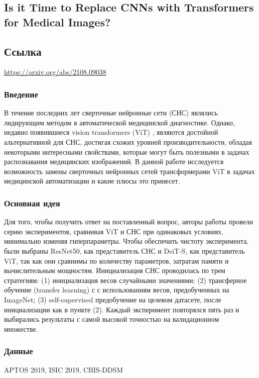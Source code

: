 \subsection*{Is it Time to Replace CNNs with Transformers for Medical Images?}

\subsection*{Ссылка} \url{https://arxiv.org/abs/2108.09038}
\subsubsection*{Введение}
В течение последних лет сверточные нейронные сети (СНС)
являлись лидирующим методом в автоматической медицинской 
диагностике. Однако, недавно появившиеся vision transformers
(ViT) \cite{Transformers}, являются достойной альтернативной для СНС, достигая 
схожих уровней производительности, обладая некоторыми интересными свойствами,
которые могут быть полезными в задачах распознавания медицинских 
изображений. В данной работе исследуется возможность замены 
сверточных нейронных сетей трансформерами ViT в задачах 
медицинской автоматизации и какие плюсы это принесет. 
\subsubsection*{Основная идея}
Для того, чтобы получить ответ на поставленный вопрос, авторы работы \cite{ann11}
провели серию экспериментов, сравнивая ViT и СНС при одинаковых
условиях, минимально изменяя гиперпараметры. Чтобы обеспечить 
чистоту эксперимента, были выбраны ResNet50, как представитель СНС 
и DeiT-S, как представитель ViT, так как они сравнимы по 
количеству параметров, затратам памяти и вычислительным мощностям.
Инициализация СНС проводилась по трем стратегиям: (1) инициализация весов 
случайными значениями; (2) трансферное обучение (transfer learning) с 
с использованиям весов, предобученных на ImageNet; (3) self-supervised предобучение 
на целевом датасете, после инициализации как в пункте (2). Каждый эксперимент
повторялся пять раз и выбирались результаты с самой высокой точностью
на валидационном множестве.
\subsubsection*{Данные}
APTOS 2019, ISIC 2019, CBIS-DDSM
